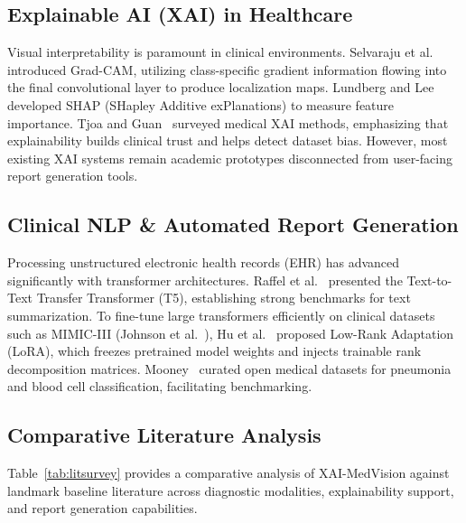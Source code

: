 \documentclass[conference]{IEEEtran}
\begin{document}
\subsection{Explainable AI (XAI) in Healthcare}
Visual interpretability is paramount in clinical environments. Selvaraju et al.~\cite{b2} introduced Grad-CAM, utilizing class-specific gradient information flowing into the final convolutional layer to produce localization maps. Lundberg and Lee~\cite{b3} developed SHAP (SHapley Additive exPlanations) to measure feature importance. Tjoa and Guan~\cite{b15} surveyed medical XAI methods, emphasizing that explainability builds clinical trust and helps detect dataset bias. However, most existing XAI systems remain academic prototypes disconnected from user-facing report generation tools.

\subsection{Clinical NLP & Automated Report Generation}
Processing unstructured electronic health records (EHR) has advanced significantly with transformer architectures. Raffel et al.~\cite{b4} presented the Text-to-Text Transfer Transformer (T5), establishing strong benchmarks for text summarization. To fine-tune large transformers efficiently on clinical datasets such as MIMIC-III (Johnson et al.~\cite{b11}), Hu et al.~\cite{b5} proposed Low-Rank Adaptation (LoRA), which freezes pretrained model weights and injects trainable rank decomposition matrices. Mooney~\cite{b10} curated open medical datasets for pneumonia and blood cell classification, facilitating benchmarking.

\subsection{Comparative Literature Analysis}
Table~\ref{tab:litsurvey} provides a comparative analysis of XAI-MedVision against landmark baseline literature across diagnostic modalities, explainability support, and report generation capabilities.
\end{document}

